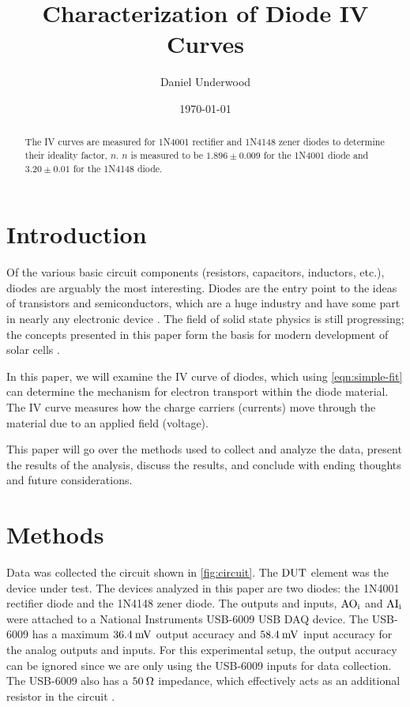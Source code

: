 \documentclass[reprint]{revtex4-1}
\begin{document}
\title{Characterization of Diode IV Curves}
\author{Daniel Underwood}
\date{\today}

\begin{abstract}

The IV curves are measured for \textsc{1N4001} rectifier and \textsc{1N4148} zener diodes to determine their ideality factor, $n$. $n$ is measured to be $1.896 \pm 0.009$ for the \textsc{1N4001} diode and $3.20 \pm 0.01$ for the \textsc{1N4148} diode.

\end{abstract}
\maketitle

\section{Introduction}

Of the various basic circuit components (resistors, capacitors, inductors, etc.), diodes are arguably the most interesting. Diodes are the entry point to the ideas of transistors and semiconductors, which are a huge industry and have some part in nearly any electronic device \cite{Ross1998}. The field of solid state physics is still progressing; the concepts presented in this paper form the basis for modern development of solar cells \cite{Deibel2010,Jain2005}.

In this paper, we will examine the IV curve of diodes, which using \cref{eqn:simple-fit} can determine the mechanism for electron transport within the diode material. The IV curve measures how the charge carriers (currents) move through the material due to an applied field (voltage).

This paper will go over the methods used to collect and analyze the data, present the results of the analysis, discuss the results, and conclude with ending thoughts and future considerations.

\section{Methods}

Data was collected the circuit shown in \cref{fig:circuit}. The $\rm{DUT}$ element was the device under test. The devices analyzed in this paper are two diodes: the \textsc{1N4001} rectifier diode and the \textsc{1N4148} zener diode. The outputs and inputs, $\rm{AO}_i$ and $\rm{AI}_i$ were attached to a National Instruments USB-6009 USB DAQ device. The USB-6009 has a maximum $36.4\:\rm{mV}$ output accuracy and $58.4\:\rm{mV}$ input accuracy for the analog outputs and inputs. For this experimental setup, the output accuracy can be ignored since we are only using the USB-6009 inputs for data collection. The USB-6009 also has a $50\:\rm{\Omega}$ impedance, which effectively acts as an additional resistor in the circuit \cite{Instruments2014}. 
\end{document}
